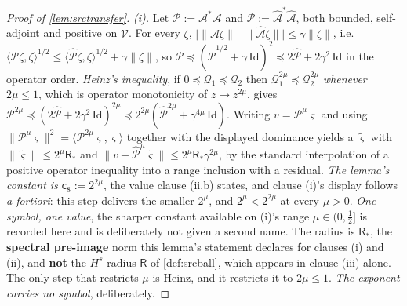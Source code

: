 \begin{proof}[Proof of \cref{lem:srctransfer}]
\emph{(i).} Let $\mathcal P:=\mathcal A^\ast\mathcal A$ and $\hat{\mathcal P}:=\hat{\mathcal A}^\ast\hat{\mathcal A}$,
both bounded, self-adjoint and positive on $\mathcal V$. For every $\zeta$,
$\big|\|\mathcal A\zeta\|-\|\hat{\mathcal A}\zeta\|\big|\le\gamma\|\zeta\|$, i.e.
$\langle\mathcal P\zeta,\zeta\rangle^{1/2}\le\langle\hat{\mathcal P}\zeta,\zeta\rangle^{1/2}+\gamma\|\zeta\|$,
so $\mathcal P\preceq(\hat{\mathcal P}^{1/2}+\gamma\,\mathrm{Id})^{2}\preceq2\hat{\mathcal P}+2\gamma^{2}\,\mathrm{Id}$ in the
operator order. \emph{Heinz's inequality}, if $0\preceq\mathcal Q_1\preceq\mathcal Q_2$ then
$\mathcal Q_1^{2\mu}\preceq\mathcal Q_2^{2\mu}$ \emph{whenever $2\mu\le1$}, which is operator
monotonicity of $z\mapsto z^{2\mu}$, gives
$\mathcal P^{2\mu}\preceq(2\hat{\mathcal P}+2\gamma^{2}\,\mathrm{Id})^{2\mu}
\preceq2^{2\mu}(\hat{\mathcal P}^{2\mu}+\gamma^{4\mu}\,\mathrm{Id})$. Writing
$v=\mathcal P^{\mu}\varsigma$ and using
$\|\mathcal P^{\mu}\varsigma\|^{2}=\langle\mathcal P^{2\mu}\varsigma,\varsigma\rangle$ together with the
displayed dominance yields a $\tilde\varsigma$ with $\|\tilde\varsigma\|\le2^{\mu}\mathsf R_\ast$ and
$\|v-\hat{\mathcal P}^{\mu}\tilde\varsigma\|\le2^{\mu}\mathsf R_\ast\gamma^{2\mu}$, by the
standard interpolation of a positive operator inequality into a range inclusion with a residual.
\emph{The lemma's constant is $\mathsf c_8:=2^{2\mu}$}, the value clause \textup{(ii.b)} states, and
clause \textup{(i)}'s display follows \emph{a fortiori}: this step delivers the smaller $2^{\mu}$, and
$2^{\mu}<2^{2\mu}$ at every $\mu>0$. \emph{One symbol, one value}, the sharper constant available on
(i)'s range $\mu\in(0,\tfrac12]$ is recorded here and is deliberately not given a second name.
The radius is $\mathsf R_\ast$, the \textbf{spectral pre-image} norm this
lemma's statement declares for clauses \textup{(i)} and \textup{(ii)}, and \textbf{not} the $H^{s}$
radius $\mathsf R$ of \cref{def:srcball}, which appears in clause \textup{(iii)} alone.
The only step that restricts $\mu$ is Heinz, and it restricts it to
$2\mu\le1$. \emph{The exponent carries no symbol}, deliberately.


\end{proof}
